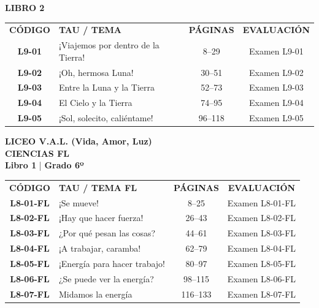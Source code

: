 \documentclass[12pt, letterpaper]{article}
\begin{document}
	\noindent \textbf{\Large \color{valblue} LIBRO 2} 
	\vspace{0.2cm} 
	\begin{center} 
		\large 
		\begin{tabularx}{\textwidth}{cXcc} 
			\textbf{CÓDIGO} & \textbf{TAU / TEMA} & \textbf{PÁGINAS} & \textbf{EVALUACIÓN} \\ 
			\textbf{L9-01} & ¡Viajemos por dentro de la Tierra! &  8--29 & Examen L9-01 \\ 
			\rowcolor{valgray} \textbf{L9-02} & ¡Oh, hermosa Luna! &  30--51 & Examen L9-02 \\ 
			\textbf{L9-03} & Entre la Luna y la Tierra &  52--73 & Examen L9-03 \\ 
			\rowcolor{valgray} \textbf{L9-04} & El Cielo y la Tierra &  74--95 & Examen L9-04 \\ 
			\textbf{L9-05} & ¡Sol, solecito, caliéntame! &  96--118 & Examen L9-05 \\ 
		\end{tabularx} 
	\end{center} 
	\newpage 
	
	\begin{center} 
		{\huge \textbf{\color{valblue} LICEO V.A.L. (Vida, Amor, Luz)}}\\[0.2cm] 
		{\Large \textbf{CIENCIAS FL}}\\[0.2cm] 
		{\large \textbf{Libro 1} \quad | \quad \textbf{Grado 6º}} 
	\end{center} 
	\vspace{0.8cm} 
	
	\renewcommand{\arraystretch}{3.5}
	
	\begin{center} 
		\large 
		\begin{tabularx}{\textwidth}{cXcc} 
			\textbf{CÓDIGO} & \textbf{TAU / TEMA FL} & \textbf{PÁGINAS} & \textbf{EVALUACIÓN} \\ 
			\textbf{L8-01-FL} & ¡Se mueve!  &  8--25 & Examen L8-01-FL \\ 
			\rowcolor{valgray} \textbf{L8-02-FL} & ¡Hay que hacer fuerza!  &  26--43 & Examen L8-02-FL \\ 
			\textbf{L8-03-FL} & ¿Por qué pesan las cosas?  &  44--61 & Examen L8-03-FL \\ 
			\rowcolor{valgray} \textbf{L8-04-FL} & ¡A trabajar, caramba!  &  62--79 & Examen L8-04-FL \\ 
			\textbf{L8-05-FL} & ¡Energía para hacer trabajo!  &  80--97 & Examen L8-05-FL \\ 
			\rowcolor{valgray} \textbf{L8-06-FL} & ¿Se puede ver la energía?  &  98--115 & Examen L8-06-FL \\ 
			\textbf{L8-07-FL} & Midamos la energía  &  116--133 & Examen L8-07-FL \\ 
		\end{tabularx} 
	\end{center} 
	\newpage 
	
\end{document}
